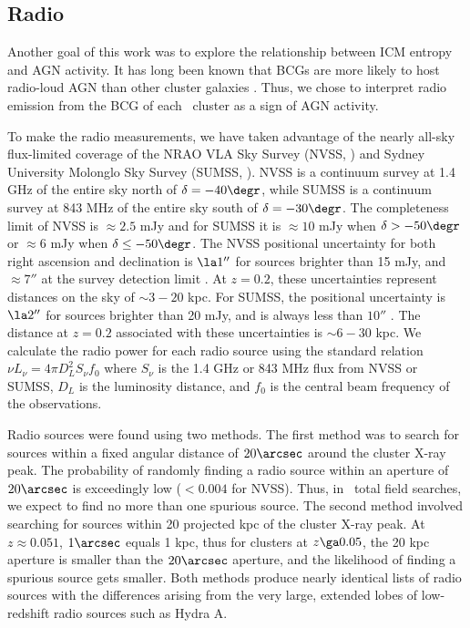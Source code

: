 \documentclass{emulateapj}
\begin{document}
\subsection{Radio}
\label{sec:radio}

Another goal of this work was to explore the relationship between ICM
entropy and AGN activity. It has long been known that BCGs are more
likely to host radio-loud AGN than other cluster galaxies
\citep{burns81, valentijn83, burns90}. Thus, we chose to interpret
radio emission from the BCG of each \accept\ cluster as a sign of AGN
activity.

To make the radio measurements, we have taken advantage of the nearly
all-sky flux-limited coverage of the NRAO VLA Sky Survey (NVSS,
\citealt{nvss}) and Sydney University Molonglo Sky Survey (SUMSS,
\citealt{sumss1, sumss2}). NVSS is a continuum survey at 1.4 GHz of
the entire sky north of $\delta = -40\degr$, while SUMSS is a
continuum survey at 843 MHz of the entire sky south of $\delta =
-30\degr$. The completeness limit of NVSS is $\approx 2.5$ mJy and for
SUMSS it is $\approx 10$ mJy when $\delta > -50\degr$ or $\approx 6$
mJy when $\delta \leq -50\degr$. The NVSS positional uncertainty for
both right ascension and declination is $\la 1''$ for sources brighter
than 15 mJy, and $\approx 7''$ at the survey detection limit
\citep{nvss}. At $z=0.2$, these uncertainties represent distances on
the sky of $\sim3-20$ kpc. For SUMSS, the positional uncertainty is
$\la 2''$ for sources brighter than 20 mJy, and is always less than
$10''$ \citep{sumss1,sumss2}. The distance at $z=0.2$ associated with
these uncertainties is $\sim6-30$ kpc. We calculate the radio power
for each radio source using the standard relation $\nu L_{\nu} = 4 \pi
D_L^2 S_{\nu} f_0$ where $S_{\nu}$ is the 1.4 GHz or 843 MHz flux from
NVSS or SUMSS, $D_L$ is the luminosity distance, and $f_0$ is the
central beam frequency of the observations.

Radio sources were found using two methods. The first method was to
search for sources within a fixed angular distance of $20\arcsec$
around the cluster X-ray peak. The probability of randomly finding a
radio source within an aperture of $20\arcsec$ is exceedingly low ($<
0.004$ for NVSS). Thus, in \clnum\ total field searches, we expect to
find no more than one spurious source. The second method involved
searching for sources within 20 projected kpc of the cluster X-ray
peak. At $z \approx 0.051$, $1\arcsec$ equals 1 kpc, thus for clusters
at $z \ga 0.05$, the 20 kpc aperture is smaller than the $20\arcsec$
aperture, and the likelihood of finding a spurious source gets
smaller. Both methods produce nearly identical lists of radio sources
with the differences arising from the very large, extended lobes of
low-redshift radio sources such as Hydra A.
\end{document}
